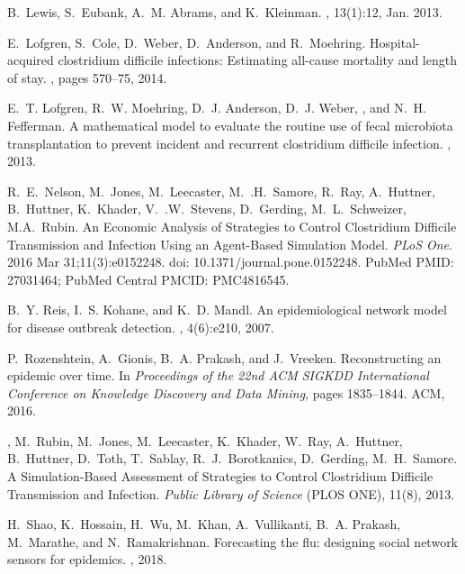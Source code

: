 \documentclass[10pt,letterpaper]{article}
\begin{document}
\begin{thebibliography}{}
B.~Lewis, S.~Eubank, A.~M. Abrams, and K.~Kleinman.
, 13(1):12, Jan.
  2013.

E.~Lofgren, S.~Cole, D.~Weber, D.~Anderson, and R.~Moehring.
\newblock Hospital-acquired clostridium difficile infections: Estimating
  all-cause mortality and length of stay.
, pages 570--75, 2014.

E.~T. Lofgren, R.~W. Moehring, D.~J. Anderson, D.~J. Weber, , and N.~H.
  Fefferman.
\newblock A mathematical model to evaluate the routine use of fecal microbiota
  transplantation to prevent incident and recurrent clostridium difficile
  infection.
, 2013.

\newblock R.~E.~Nelson, M.~Jones, M.~Leecaster, M.~.H.~Samore, R.~Ray, A.~Huttner, B.~Huttner, 
K.~Khader, V.~.W.~Stevens, D.~Gerding, M.~L.~Schweizer, M.A.~Rubin. 
\newblock An Economic Analysis of Strategies to Control Clostridium Difficile Transmission and Infection Using an Agent-Based Simulation Model. 
\newblock \emph{PLoS One}. 
2016 Mar 31;11(3):e0152248. doi: 10.1371/journal.pone.0152248. PubMed PMID: 27031464; PubMed Central PMCID: PMC4816545.

B.~Y. Reis, I.~S. Kohane, and K.~D. Mandl.
\newblock An epidemiological network model for disease outbreak detection.
, 4(6):e210, 2007.

P.~Rozenshtein, A.~Gionis, B.~A. Prakash, and J.~Vreeken.
\newblock Reconstructing an epidemic over time.
\newblock In {\em Proceedings of the 22nd ACM SIGKDD International Conference
  on Knowledge Discovery and Data Mining}, pages 1835--1844. ACM, 2016.

,
M.~Rubin, M.~Jones, M.~Leecaster, K.~Khader, W.~Ray, A.~Huttner, B.~Huttner, D.~Toth, T.~Sablay, R.~J.~Borotkanics, 
D.~Gerding, M.~H.~Samore.
\newblock A Simulation-Based Assessment of Strategies to Control Clostridium Difficile Transmission and Infection.
\newblock \emph{Public Library of Science} (PLOS ONE), 11(8), 2013.

H.~Shao, K.~Hossain, H.~Wu, M.~Khan, A.~Vullikanti, B.~A. Prakash, M.~Marathe,
  and N.~Ramakrishnan.
\newblock Forecasting the flu: designing social network sensors for epidemics.
, 2018.


\end{thebibliography}
\end{document}

